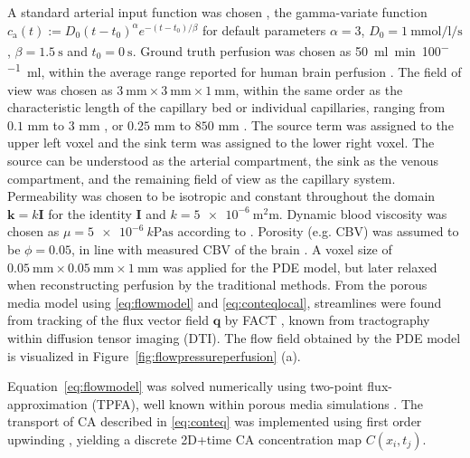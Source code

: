 \documentclass[journal,twocolumn]{IEEEtran}
\newcommand{\ca}{c_\mathrm{a}}
\newcommand{\vq}{\mathbf{q}}
\newcommand{\simu}{k\pascal\second}
\newcommand{\siPml}{\milli\litre\per\minute\per100\milli\litre}
\begin{document}
	A standard arterial input function was chosen \cite{ostergaard96}, the gamma-variate function $\ca(t) := D_0(t-t_0)^\alpha e^{-(t-t_0)/\beta}$ for default parameters $\alpha=3$, $D_0 = \SI{1}{\milli\mol\per\litre\per\second}$, $\beta = \SI{1.5}{\second}$ and $t_0 = \SI{0}{\second}$.
	Ground truth perfusion was chosen as \SI{50}{\siPml}, within the average range reported for human brain perfusion \cite{Obrist1984,Smith00}. The field of view was chosen as $\SI{3}{\milli\meter}\times\SI{3}{\milli\meter}\times\SI{1}{\milli\meter}$, within the same order as the characteristic length of the capillary bed or individual capillaries, ranging from $0.1$ mm to $3$ mm \cite{Cho2011}, or $0.25$ mm to $850$ mm \cite{Townsley2012}.
	The source term was assigned to the upper left voxel and the sink term was assigned to the lower right voxel. The source can be understood as the arterial compartment, the sink as the venous compartment, and the remaining field of view as the capillary system. 
	Permeability was chosen to be isotropic and constant throughout the domain $\mathbf{k}=k\mathbf{I}$ for the identity $\mathbf{I}$ and $k=\SI{5e-6}{\square\milli\meter}$.
	Dynamic blood viscosity was chosen as $\mu=\SI{5e-6}{\simu}$ according to \cite{rosencranz06}.
	Porosity (e.g. CBV) was assumed to be $\phi = 0.05$, in line with measured CBV of the brain \cite{Smith00}.
A voxel size of $\SI{0.05}{\milli\meter} \times\SI{0.05}{\milli\meter}\times\SI{1}{\milli\meter}$ was applied for the PDE model, but later relaxed when reconstructing perfusion by the traditional methods. From the porous media model using \eqref{eq:flowmodel} and \eqref{eq:conteqlocal}, streamlines were found from tracking of the flux vector field $\vq$ by FACT \cite{Mori1998}, known from  tractography within diffusion tensor imaging (DTI). 
	The flow field obtained by the PDE model is visualized in Figure~\ref{fig:flowpressureperfusion} (a).

	Equation~\eqref{eq:flowmodel} was solved numerically using two-point flux-approximation (TPFA), well known within porous media simulations \cite{Aarnes2007}.
	The transport of CA described in \eqref{eq:conteq} was implemented using first order upwinding \cite{Patankar80}, yielding a discrete 2D+time CA concentration map $C(x_i,t_j)$.
\end{document}
